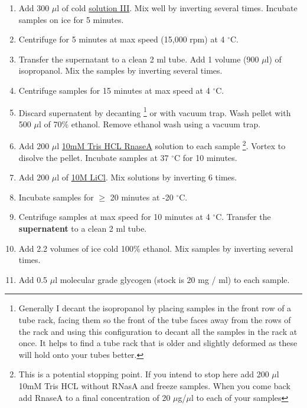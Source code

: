 \documentclass[12pt]{article}
\theoremstyle{definition}
\begin{document}
\begin{enumerate}
	\item Add 300 $\mu$l of cold \hyperref[sec:sol-3]{solution III}. Mix well by inverting several times. Incubate samples on ice for 5 minutes.
	
	\item Centrifuge for 5 minutes at max speed (15,000 rpm) at 4  $^{\circ}$C.
	
	\item Transfer the supernatant to a clean 2 ml tube. Add 1 volume (900 $\mu$l) of isopropanol. Mix the samples by inverting several times.
	
	\item Centrifuge samples for 15 minutes at max speed at 4  $^{\circ}$C.
	
	\item Discard supernatent by decanting \footnote{Generally I decant the isopropanol by placing samples in the front row of a tube rack, facing them so the front of the tube faces away from the rows of the rack and using this configuration to decant all the samples in the rack at once. It helps to find a tube rack that is older and slightly deformed as these will hold onto your tubes better.} or with vacuum trap. Wash pellet with 500 $\mu$l of 70\% ethanol. Remove ethanol wash using a vacuum trap.
	
	\item Add 200 $\mu$l \hyperref[sec:tris]{10mM Tris HCL RnaseA} solution to each sample \footnote{This is a potential stopping point. If you intend to stop here add 200  $\mu$l 10mM Tris HCL without RNasA and freeze samples. When you come back add RnaseA to a final concentration of 20 $\mu$g/$\mu$l to each of your samples}. Vortex to disolve the pellet. Incubate samples at 37 $^{\circ}$C for 10 minutes.
	
	\item Add 200 $\mu$l of \hyperref[sec:licl]{10M LiCl}. Mix solutions by inverting 6 times.
	
	\item Incubate samples for $ \geq$ 20 minutes at -20 $^{\circ}$C.
	
	\item  Centrifuge samples at max speed for 10 minutes at 4  $^{\circ}$C. Transfer the \textbf{supernatent} to a clean 2 ml tube.
	
	\item Add 2.2 volumes of ice cold 100\% ethanol. Mix samples by inverting several times.
	
	\item Add 0.5 $\mu$l molecular grade glycogen (stock is 20 mg / ml) to each sample.
	

\end{enumerate}
\end{document}
